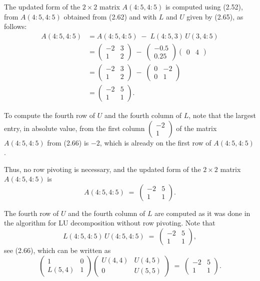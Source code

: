 The updated form of the $2\times 2$ matrix $A(4:5,4:5)$ is computed using
(2.52), from $A(4:5,4:5)$ obtained from (2.62) and with $L$ and $U$ given by
(2.65), as follows:
\begin{align*}
A(4:5,4:5)
&= A(4:5,4:5) \;-\; L(4:5,3)\, U(3,4:5)\\
&= \begin{pmatrix} -2 & 3\\ 1 & 2 \end{pmatrix}
\;-\;
\begin{pmatrix} -0.5\\ 0.25 \end{pmatrix}
\begin{pmatrix} 0 & 4 \end{pmatrix}\\
&= \begin{pmatrix} -2 & 3\\ 1 & 2 \end{pmatrix}
\;-\;
\begin{pmatrix} 0 & -2\\ 0 & 1 \end{pmatrix}\\
&= \begin{pmatrix} -2 & 5\\ 1 & 1 \end{pmatrix}.
\end{align*}

To compute the fourth row of $U$ and the fourth column of $L$, note that the
largest entry, in absolute value, from the first column
$\begin{pmatrix} -2\\ 1 \end{pmatrix}$ of the matrix $A(4:5,4:5)$ from
(2.66) is $-2$, which is already on the first row of $A(4:5,4:5)$.

Thus, no row pivoting is necessary, and the updated form of the $2\times 2$
matrix $A(4:5,4:5)$ is
\begin{equation}
A(4:5,4:5) \;=\; \begin{pmatrix} -2 & 5\\ 1 & 1 \end{pmatrix}.
\end{equation}

The fourth row of $U$ and the fourth column of $L$ are computed as it was
done in the algorithm for LU decomposition without row pivoting. Note that
\[
L(4:5,4:5)\, U(4:5,4:5) \;=\; \begin{pmatrix} -2 & 5\\ 1 & 1 \end{pmatrix},
\]
see (2.66), which can be written as
\[
\begin{pmatrix} 1 & 0\\ L(5,4) & 1 \end{pmatrix}
\begin{pmatrix} U(4,4) & U(4,5)\\ 0 & U(5,5) \end{pmatrix}
\;=\;
\begin{pmatrix} -2 & 5\\ 1 & 1 \end{pmatrix}.
\]


